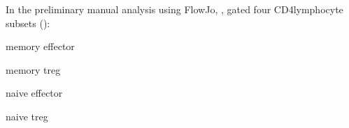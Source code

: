 In the preliminary manual analysis using FlowJo, ,
gated four CD4\positive lymphocyte subsets ():
\begin{itemise}
  \item memory effector
  \item memory treg
  \item naive effector
  \item naive treg
\end{itemise}
% 
